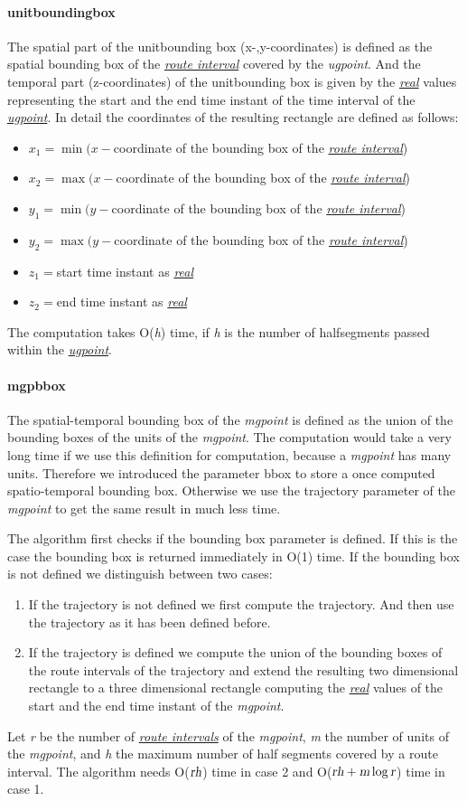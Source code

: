 \documentclass[a4paper]{article}
\newcommand{\op}[1]{\textbf{#1}}
\newcommand{\var}[1]{\textsl{#1}}
\newcommand{\dt}[1]{\textsl{\underline{#1}}}
\begin{document}
\paragraph{\op{unitboundingbox}}
The spatial part of the unitbounding box (x-,y-coordinates) is defined as the spatial bounding box of the \dt{route interval} covered by the \var{ugpoint}. And the temporal part (z-coordinates) of the unitbounding box is given by the \dt{real} values representing the start and the end time instant of the time interval of the \dt{ugpoint}.  In detail the coordinates of the resulting rectangle are defined as follows:
\begin{itemize}
\item $x_1 =  \min(x-$coordinate of the bounding box of the \dt{route interval})
\item $x_2 =  \max(x-$coordinate of the bounding box of the \dt{route interval})
\item $y_1 =  \min(y-$coordinate of the bounding box of the \dt{route interval})
\item $y_2 =  \max(y-$coordinate of the bounding box of the \dt{route interval})
\item $z_1 = $start time instant as \dt{real}
\item $z_2 = $end time instant as \dt{real}
\end{itemize}
The computation takes O(\var{h}) time, if \var{h} is the number of halfsegments passed within the \dt{ugpoint}.
\paragraph{\op{mgpbbox}}
The spatial-temporal bounding box of the \var{mgpoint} is defined as the union of the bounding boxes of the units of the \var{mgpoint}. The computation would take a very long time if we use this definition for computation, because a \var{mgpoint} has many units. Therefore we introduced the parameter bbox to store a once computed spatio-temporal bounding box. Otherwise we use the trajectory parameter of the \var{mgpoint} to get the same result in much less time.

The algorithm first checks if the bounding box parameter is defined. If this is the case the bounding box is returned immediately in O(1) time. If the bounding box is not defined we distinguish between two cases:
\begin{enumerate}
\item If the trajectory is not defined we first compute the trajectory. And then use the trajectory as it has been defined before.
\item If the trajectory is defined we compute the union of the bounding boxes of the route intervals of the trajectory and extend the resulting two dimensional rectangle to a three dimensional rectangle computing the \dt{real} values of the start and the end time instant of the \var{mgpoint}.
\end{enumerate}
Let \var{r} be the number of \dt{route intervals} of the \var{mgpoint}, \var{m} the number of units of the \var{mgpoint}, and \var{h} the maximum number of half segments covered by a route interval. The algorithm needs  O($\var{r}\var{h}$) time in case 2 and O($ \var{r}\var{h}+\var{m} \log \var{r}$) time in case 1.
\end{document}
